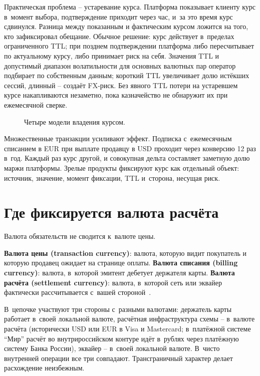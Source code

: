 Практическая проблема -- устаревание курса. Платформа
показывает клиенту курс в~момент выбора, подтверждение
приходит через час, и~за это время курс сдвинулся. Разница
между показанным и фактическим курсом ложится на того,
кто зафиксировал обещание. Обычное решение: курс действует
в~пределах ограниченного TTL; при позднем подтверждении
платформа либо пересчитывает по актуальному курсу, либо
принимает риск на себя. Значения TTL и допустимый диапазон
волатильности для основных валютных пар оператор подбирает
по собственным данным; короткий TTL увеличивает долю
истёкших сессий, длинный -- создаёт FX-риск. Без явного
TTL потери на устаревшем курсе накапливаются незаметно,
пока казначейство не обнаружит их при ежемесячной сверке.

\begin{figure}[tbp]
  \centering
  \caption{Четыре модели владения курсом.}\label{fig:fx-ownership-models}
\end{figure}

Множественные транзакции усиливают эффект. Подписка
с~ежемесячным списанием в EUR при выплате продавцу в USD
проходит через конверсию 12 раз в~год. Каждый раз курс
другой, и совокупная дельта составляет заметную долю маржи
платформы. Зрелые продукты фиксируют курс как отдельный
объект: источник, значение, момент фиксации, TTL и~сторона,
несущая риск.

\section{Где фиксируется валюта расчёта}\label{sec:mc-settlement}

Валюта обязательств не сводится к~валюте цены.

\textbf{Валюта цены (transaction currency)}: валюта,
которую видит покупатель и которую продавец ожидает
на странице оплаты.
\textbf{Валюта списания (billing currency)}: валюта,
в~которой эмитент дебетует держателя карты.
\textbf{Валюта расчёта (settlement currency)}: валюта,
в~которой сеть или эквайер фактически рассчитывается с~вашей
стороной~\cite{visa-core-rules,mc-rules}.

В~цепочке участвуют три стороны с~разными валютами:
держатель карты работает в~своей локальной валюте, расчётная
инфраструктура схемы -- в~валюте расчёта (исторически USD
или EUR в Visa и Mastercard; в~платёжной системе \enquote{Мир}
расчёт во внутрироссийском контуре идёт в~рублях через
платёжную систему Банка России), эквайер -- в~своей локальной
валюте. В~чисто внутренней операции все три совпадают.
Трансграничный характер делает расхождение неизбежным.

